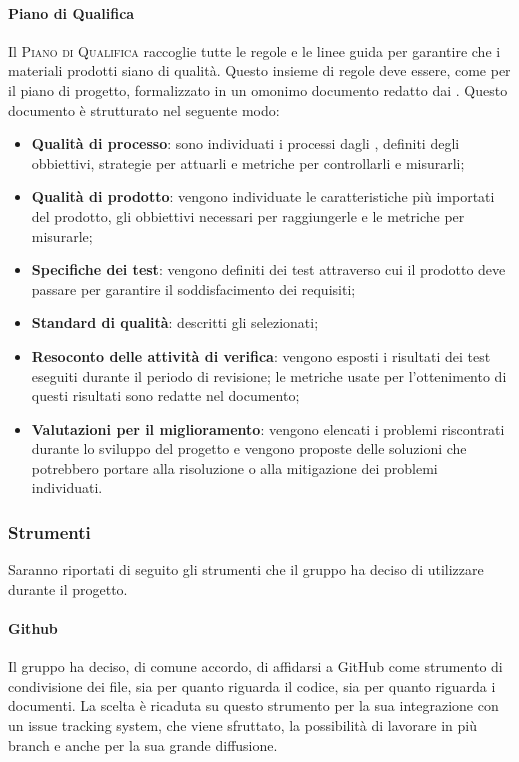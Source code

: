 \documentclass[../norme_di_progetto.tex]{subfiles}
\begin{document}
\paragraph{Piano di Qualifica}
Il \textsc{Piano di Qualifica} raccoglie tutte le regole e le linee guida per garantire che i materiali prodotti siano di qualità. Questo insieme di regole deve essere, come per il piano di progetto, formalizzato in un omonimo documento redatto dai .
Questo documento è strutturato nel seguente modo:
\begin{itemize}
    \item \textbf{Qualità di processo}: sono individuati i processi dagli , definiti degli obbiettivi, strategie per attuarli e metriche per controllarli e misurarli;
    \item \textbf{Qualità di prodotto}: vengono individuate le caratteristiche più importati del prodotto, gli obbiettivi necessari per raggiungerle e le metriche per misurarle;
    \item \textbf{Specifiche dei test}: vengono definiti dei test attraverso cui il prodotto deve passare per garantire il soddisfacimento dei requisiti;
    \item \textbf{Standard di qualità}: descritti gli  selezionati;
    \item \textbf{Resoconto delle attività di verifica}: vengono esposti i risultati dei test eseguiti durante il periodo di revisione; le metriche usate per l'ottenimento di questi risultati sono redatte nel documento;
    \item \textbf{Valutazioni per il miglioramento}: vengono elencati i problemi riscontrati durante lo sviluppo del progetto e vengono proposte delle soluzioni che potrebbero portare alla risoluzione o alla mitigazione dei problemi individuati.
\end{itemize} 

\subsubsection{Strumenti}
Saranno riportati di seguito gli strumenti che il gruppo ha deciso di utilizzare durante il progetto.

\paragraph{Github}
Il gruppo ha deciso, di comune accordo, di affidarsi a GitHub come strumento di condivisione dei file, sia per quanto riguarda il codice, sia per quanto riguarda i documenti. La scelta è ricaduta su questo strumento per la sua integrazione con un issue tracking system, che viene sfruttato, la possibilità di lavorare in più branch e anche per la sua grande diffusione.
\end{document}
